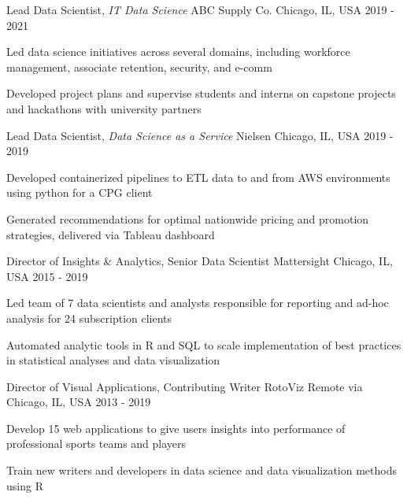 \begin{cventries}
  \cventry
    {Lead Data Scientist, \textit{IT Data Science}} %
    {ABC Supply Co.} %
    {Chicago, IL, USA} %
    {2019 - 2021} %
    {
      \begin{cvitems}
        \item {Led data science initiatives across several domains, including workforce management, associate retention, security, and e-comm}
        \item {Developed project plans and supervise students and interns on capstone projects and hackathons with university partners}
      \end{cvitems}
    }

 \cventry
    {Lead Data Scientist, \textit{Data Science as a Service}} %
    {Nielsen} %
    {Chicago, IL, USA} %
    {2019 - 2019} %
    {
      \begin{cvitems}
        \item {Developed containerized pipelines to ETL data to and from AWS environments using python for a CPG client}
        \item {Generated recommendations for optimal nationwide pricing and promotion strategies, delivered via Tableau dashboard}
      \end{cvitems}
    }

 \cventry
    {Director of Insights \& Analytics, Senior Data Scientist} %
    {Mattersight} %
    {Chicago, IL, USA} %
    {2015 - 2019} %
    {
      \begin{cvitems}
        \item {Led team of 7 data scientists and analysts responsible for reporting and ad-hoc analysis for 24 subscription clients}
        \item {Automated analytic tools in R and SQL to scale implementation of best practices in statistical analyses and data visualization}
      \end{cvitems}
    }
    
 \cventry
    {Director of Visual Applications, Contributing Writer}
    {RotoViz}
    {Remote via Chicago, IL, USA}
    {2013 - 2019}
    {
     \begin{cvitems}
       \item {Develop 15 web applications to give users insights into performance of professional sports teams and players}
       \item {Train new writers and developers in data science and data visualization methods using R}
     \end{cvitems}
   }
   

\end{cventries}
